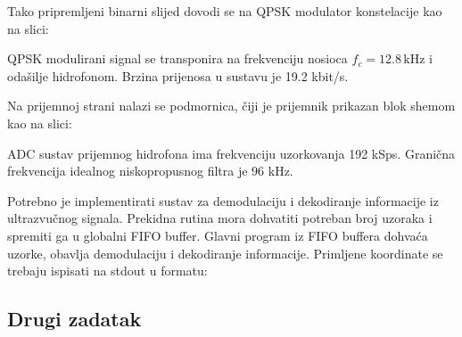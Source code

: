 \documentclass[a4paper]{article}
\begin{document}
Tako pripremljeni binarni slijed dovodi se na QPSK modulator konstelacije kao na slici:

\begin{figure}[h!]
\centering
{}
\end{figure}

QPSK modulirani signal se transponira na frekvenciju nosioca $f_c = 12.8 \,\textrm{kHz}$ i odašilje hidrofonom. Brzina prijenosa u sustavu je 19.2 kbit/s.

Na prijemnoj strani nalazi se podmornica, čiji je prijemnik prikazan blok shemom kao na slici:

\begin{figure}[h!]
\centering
\begin{tikzpicture}
\end{tikzpicture}
\end{figure}

ADC sustav prijemnog hidrofona ima frekvenciju uzorkovanja 192 kSps. Granična frekvencija idealnog niskopropusnog filtra je 96 kHz.

Potrebno je implementirati sustav za demodulaciju i dekodiranje informacije iz ultrazvučnog signala. Prekidna rutina mora dohvatiti potreban broj uzoraka i spremiti ga u globalni FIFO buffer. Glavni program iz FIFO buffera dohvaća uzorke, obavlja demodulaciju i dekodiranje informacije. Primljene koordinate se trebaju ispisati na stdout u formatu:

\subsection{Drugi zadatak}
\end{document}

